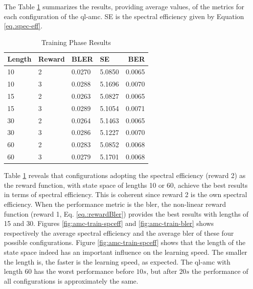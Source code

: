 %
The Table \ref{tab:amc-train-results} summarizes the results, providing average values, of the metrics for each configuration of the \gls{ql-amc}.
%
SE is the spectral efficiency given by Equation \eqref{eq.:spec-eff}.
%
\begin{table}[htb]
\centering
\caption{Training Phase Results}
\label{tab:amc-train-results}
\begin{tabularx}{0.75\columnwidth}{l X X X r}
\toprule
Length & Reward &  BLER &  SE &   BER \\
\midrule
10 &           2 & 0.0270 &  5.0850 & 0.0065 \\
10 &           3 & 0.0288 &  5.1696 & 0.0070 \\
15 &           2 & 0.0263 &  5.0827 & 0.0065 \\
15 &           3 & 0.0289 &  5.1054 & 0.0071 \\
30 &           2 & 0.0264 &  5.1463 & 0.0065 \\
30 &           3 & 0.0286 &  5.1227 & 0.0070 \\
60 &           2 & 0.0283 &  5.0852 & 0.0068 \\
60 &           3 & 0.0279 &  5.1701 & 0.0068 \\
\bottomrule
\end{tabularx}
\end{table}

Table \ref{tab:amc-train-results} reveals that configurations adopting the spectral efficiency (reward 2) as the reward function, with state space of lengths 10 or 60, achieve the best results in terms of spectral efficiency.
%
This is coherent since reward 2 is the own spectral efficiency.
%
When the performance metric is the \gls{bler}, the non-linear reward function (reward 1, Eq. \eqref{eq.:rewardBler}) provides the best results with lengths of 15 and 30.
%
Figures \ref{fig:amc-train-spceff} and \ref{fig:amc-train-bler} shows respectively the average spectral efficiency and the average \gls{bler} of these four possible configurations.
%
Figure \ref{fig:amc-train-spceff} shows that the length of the state space indeed has an important influence on the learning speed.
%
The smaller the length is, the faster is the learning speed, as expected.
%
The \gls{ql-amc} with length 60 has the worst performance before $10s$, but after $20s$ the performance of all configurations is approximately the same.
%

